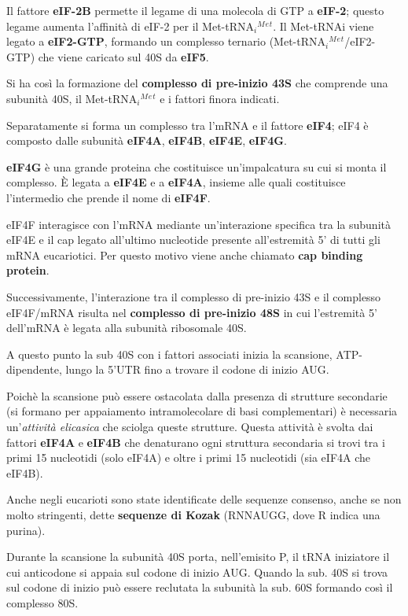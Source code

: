 \documentclass[11pt]{book}
\begin{document}
Il fattore \textbf{eIF-2B} permette il legame di una molecola di GTP a
\textbf{eIF-2}; questo legame aumenta l'affinità di eIF-2 per il
Met-tRNA\(_i\)\(^M\)\(^e\)\(^t\). Il Met-tRNAi viene legato a
\textbf{eIF2-GTP}, formando un complesso ternario
(Met-tRNA\(_i\)\(^M\)\(^e\)\(^t\)/eIF2-GTP) che viene caricato sul 40S
da \textbf{eIF5}.

Si ha così la formazione del \textbf{complesso di pre-inizio 43S} che
comprende una subunità 40S, il Met-tRNA\(_i\)\(^M\)\(^e\)\(^t\) e i
fattori finora indicati.

Separatamente si forma un complesso tra l'mRNA e il fattore
\textbf{eIF4}; eIF4 è composto dalle subunità \textbf{eIF4A},
\textbf{eIF4B}, \textbf{eIF4E}, \textbf{eIF4G}.

\textbf{eIF4G} è una grande proteina che costituisce un'impalcatura su
cui si monta il complesso. È legata a \textbf{eIF4E} e a
\textbf{eIF4A}, insieme alle quali costituisce l'intermedio che prende
il nome di \textbf{eIF4F}.

eIF4F interagisce con l'mRNA mediante un'interazione specifica tra la
subunità eIF4E e il cap legato all'ultimo nucleotide presente
all'estremità 5' di tutti gli mRNA eucariotici. Per questo motivo viene
anche chiamato \textbf{cap binding protein}.

Successivamente, l'interazione tra il complesso di pre-inizio 43S e il
complesso eIF4F/mRNA risulta nel \textbf{complesso di pre-inizio 48S} in
cui l'estremità 5' dell'mRNA è legata alla subunità ribosomale 40S.

A questo punto la sub 40S con i fattori associati inizia la scansione,
ATP-dipendente, lungo la 5'UTR fino a trovare il codone di inizio AUG.

Poichè la scansione può essere ostacolata dalla presenza di strutture
secondarie (si formano per appaiamento intramolecolare di basi
complementari) è necessaria un'\emph{attività elicasica} che sciolga
queste strutture. Questa attività è svolta dai fattori \textbf{eIF4A} e
\textbf{eIF4B} che denaturano ogni struttura secondaria si trovi tra i
primi 15 nucleotidi (solo eIF4A) e oltre i primi 15 nucleotidi (sia
eIF4A che eIF4B).

Anche negli eucarioti sono state identificate delle sequenze consenso,
anche se non molto stringenti, dette \textbf{sequenze di Kozak}
(RNNAUGG, dove R indica una purina).

Durante la scansione la subunità 40S porta, nell'emisito P, il tRNA
iniziatore il cui anticodone si appaia sul codone di inizio AUG. Quando
la sub. 40S si trova sul codone di inizio può essere reclutata la
subunità la sub. 60S formando così il complesso 80S.
\end{document}

